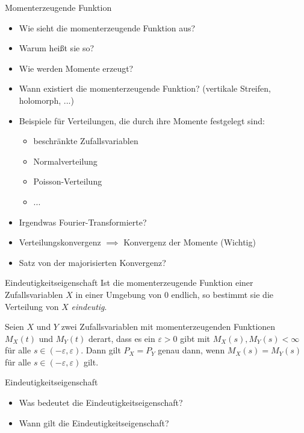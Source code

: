 \begin{info}{Momenterzeugende Funktion}
    \begin{itemize}
        \item Wie sieht die momenterzeugende Funktion aus?
        \item Warum heißt sie so?
        \item Wie werden Momente erzeugt?
        \item Wann existiert die momenterzeugende Funktion? (vertikale Streifen, holomorph, ...)
        \item Beispiele für Verteilungen, die durch ihre Momente festgelegt sind:
              \begin{itemize}
                  \item beschränkte Zufallsvariablen
                  \item Normalverteilung
                  \item Poisson-Verteilung
                  \item ...
              \end{itemize}
        \item Irgendwas Fourier-Transformierte?
        \item Verteilungskonvergenz $\implies$ Konvergenz der Momente (Wichtig)
        \item Satz von der majorisierten Konvergenz?
    \end{itemize}
\end{info}

\begin{defi}{Eindeutigkeitseigenschaft}
    Ist die momenterzeugende Funktion einer Zufallsvariablen $X$ in einer Umgebung von $0$ endlich, so bestimmt sie die Verteilung von $X$ \emph{eindeutig}.

    Seien $X$ und $Y$ zwei Zufallsvariablen mit momenterzeugenden Funktionen $M_X(t)$ und $M_Y(t)$ derart, dass es ein $\varepsilon > 0$ gibt mit $M_X(s), M_Y(s) < \infty$ für alle $s \in (-\varepsilon, \varepsilon)$.
    Dann gilt $P_X = P_Y$ genau dann, wenn $M_X(s) = M_Y(s)$ für alle $s \in (-\varepsilon, \varepsilon)$ gilt.
\end{defi}

\begin{info}{Eindeutigkeitseigenschaft}
    \begin{itemize}
        \item Was bedeutet die Eindeutigkeitseigenschaft?
        \item Wann gilt die Eindeutigkeitseigenschaft?
    \end{itemize}
\end{info}


